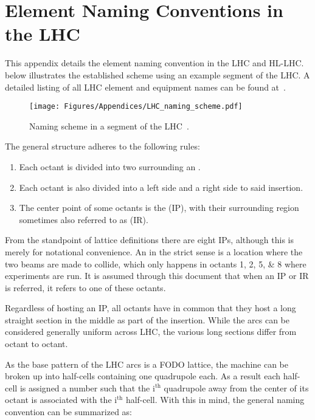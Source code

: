 \chapter{Element Naming Conventions in the LHC}
\label{appendix:naming_conventions}


This appendix details the element naming convention in the LHC and HL-LHC.
 below illustrates the established scheme using an example segment of the LHC.
A detailed listing of all LHC element and equipment names can be found at~\cite{CERN:Equipment_Codes}.

\begin{figure}[h]
    \centering
    \texttt{[image: Figures/Appendices/LHC\_naming\_scheme.pdf]}
    \caption{Naming scheme in a segment of the LHC~\cite{CERN:Element_Naming}.}
    \label{figure:lhc_segment_naming_scheme}
\end{figure}

The general structure adheres to the following rules:
\begin{enumerate}
    \item Each octant is divided into two  surrounding an .
    \item Each octant is also divided into a left side and a right side to said insertion.
    \item The center point of some octants is the  (IP), with their surrounding region sometimes also referred to as  (IR).
\end{enumerate}

From the standpoint of lattice definitions there are eight IPs, although this is merely for notational convenience. 
An  in the strict sense is a location where the two beams are made to collide, which only happens in octants \numlist{1;2;5;8} where experiments are run.
It is assumed through this document that when an IP or IR is referred, it refers to one of these octants.

Regardless of hosting an IP, all octants have in common that they host a long straight section in the middle as part of the insertion.
While the arcs can be considered generally uniform across LHC, the various long sections differ from octant to octant.

As the base pattern of the LHC arcs is a FODO lattice, the machine can be broken up into half-cells containing one quadrupole each.
As a result each half-cell is assigned a number such that the \(\mathrm{i^{th}}\) quadrupole away from the center of its octant is associated with the \(\mathrm{i^{th}}\) half-cell.
With this in mind, the general naming convention can be summarized as:

